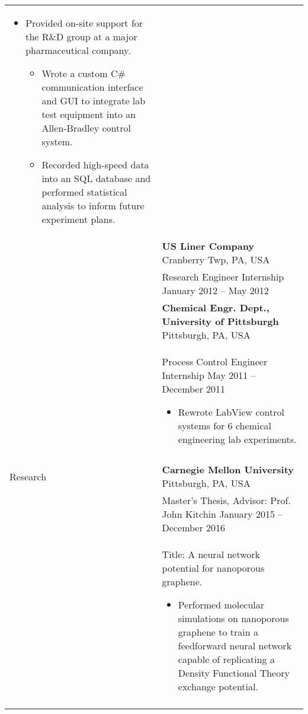 \documentclass[11pt]{article}
\begin{document}
\begin{tabular}[t]{@{}p{1.05in} @{}p{6.00in}}
\begin{itemize}
    \item Provided on-site support for the R\&D group at a major pharmaceutical company.%
    \begin{itemize}
    \renewcommand{\labelitemii}{$\cdot$}
        \item Wrote a custom C\# communication interface and GUI to integrate lab test equipment into an Allen-Bradley control system.%
        \item Recorded high-speed data into an SQL database and performed statistical analysis to inform future experiment plans.%
    \end{itemize}
    \vspace{0.5\baselineskip}
\end{itemize}
\\
&
\textbf{US Liner Company}  \hfill Cranberry Twp, PA, USA\vspace{0.015in} \\ &
Research Engineer Internship \hfill January 2012 -- May 2012\vspace{0.015in}
\vspace{0.5\baselineskip}
\\
&
\textbf{Chemical Engr. Dept., University of Pittsburgh}  \hfill Pittsburgh, PA, USA\vspace{0.015in} \\ &
Process Control Engineer Internship \hfill May 2011 -- December 2011\vspace{0.015in}
\begin{itemize}
    \renewcommand{\labelitemi}{$\diamond$}
    \item Rewrote LabView control systems for 6 chemical engineering lab experiments.%
\end{itemize}
\\
\\

{Research}
&
\textbf{Carnegie Mellon University}  \hfill Pittsburgh, PA, USA\vspace{0.015in} \\ &
Master's Thesis, Advisor: Prof. John Kitchin \hfill January 2015 -- December 2016\vspace{0.015in} \\ &
Title: A neural network potential for nanoporous graphene. \vspace{0.015in}
    \begin{itemize}
        \renewcommand{\labelitemi}{$\diamond$}
        \item Performed molecular simulations on nanoporous graphene to train a feedforward neural network capable of replicating a Density Functional Theory exchange potential.%
    \end{itemize}
\\
\\


\end{tabular}
\end{document}
